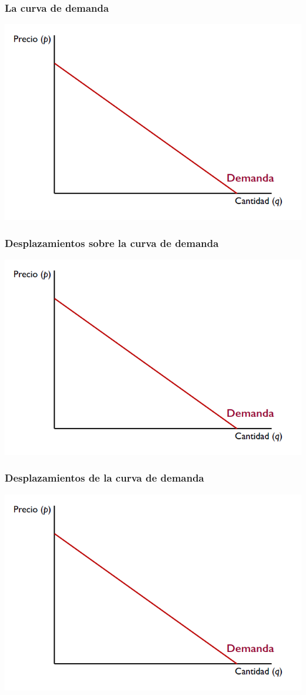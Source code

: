 \documentclass{beamer}
\begin{document}
\begin{frame}
\frametitle{La curva de demanda}
\includegraphics[scale=0.6]{../Figures/Tema_07.1_curvadeldemanda.png}
\end{frame}

\begin{frame}
\frametitle{Desplazamientos sobre la curva de demanda}
\includegraphics[scale=0.6]{../Figures/Tema_07.1_curvadeldemanda.png}
\end{frame}

\begin{frame}
\frametitle{Desplazamientos de la curva de demanda}
\includegraphics[scale=0.6]{../Figures/Tema_07.1_curvadeldemanda.png}
\end{frame}
\end{document}
